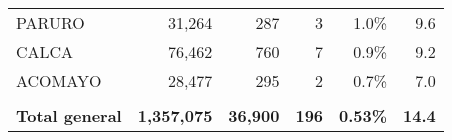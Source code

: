 \begin{tabular}{lrrrrr}
	PARURO                                & 31,264                                                         & 287                                                                              & 3                                                                & 1.0\%                                                                  & 9.6                                                                                                                               \\
	CALCA                                 & 76,462                                                         & 760                                                                              & 7                                                                & 0.9\%                                                                  & 9.2                                                                                                                               \\
	ACOMAYO                               & 28,477                                                         & 295                                                                              & 2                                                                & 0.7\%                                                                  & 7.0                                                                                                                               \\
	& \multicolumn{1}{l}{}                                           & \multicolumn{1}{l}{}                                                             & \multicolumn{1}{l}{}                                             & \multicolumn{1}{l}{}                                                   & \multicolumn{1}{l}{}                                                                                                              \\
	\rowcolor[HTML]{ECF4FF} 
	\textbf{Total general}                & \textbf{1,357,075}                                             & \textbf{36,900}                                                                  & \textbf{196}                                                     & \textbf{0.53\%}                                                        & \textbf{14.4}                                                                                                                    
\end{tabular}